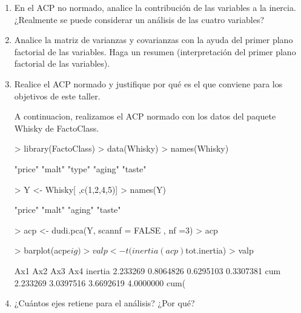 \documentclass[letterpaper, 12pt]{article}
\begin{document}
\begin{enumerate}

        \item En el ACP no normado, analice la contribución de las variables 
        a la inercia. ¿Realmente se puede considerar un análisis de las cuatro 
        variables?
        
        \item Analice la matriz de varianzas y covarianzas con la ayuda del 
        primer plano factorial de las variables. Haga un resumen (interpretación 
        del primer plano factorial de las variables).
        
        \item Realice el ACP normado y justifique por qué es el que conviene 
        para los objetivos de este taller.
        
        A continuacion, realizamos el ACP normado con los datos del paquete
        Whisky de FactoClass.
        
\begin{Schunk}
\begin{Sinput}
> library(FactoClass)
> data(Whisky)
> names(Whisky)
\end{Sinput}
\begin{Soutput}
[1] "price" "malt"  "type"  "aging" "taste"
\end{Soutput}
\begin{Sinput}
> Y <- Whisky[ ,c(1,2,4,5)]
> names(Y)
\end{Sinput}
\begin{Soutput}
[1] "price" "malt"  "aging" "taste"
\end{Soutput}
\begin{Sinput}
> acp <- dudi.pca(Y, scannf = FALSE , nf =3)
> acp
\end{Sinput}
\begin{Sinput}
> barplot(acp$eig)
> valp <- t(inertia(acp)$tot.inertia)
> valp
\end{Sinput}
\begin{Soutput}
              Ax1        Ax2        Ax3         Ax4
inertia  2.233269  0.8064826  0.6295103   0.3307381
cum      2.233269  3.0397516  3.6692619   4.0000000
cum(%)  55.831725 75.9937904 91.7315485 100.0000000
\end{Soutput}
\end{Schunk}
        \item ¿Cuántos ejes retiene para el análisis? ¿Por qué?
        

\end{enumerate}
\end{document}
